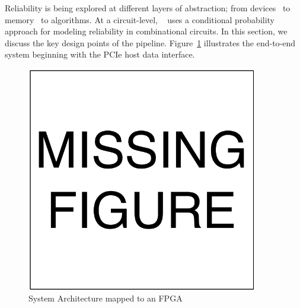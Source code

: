
Reliability is being explored at different layers of abstraction; from devices~\cite{Datta2014,Datta2015,Rahul2015} to memory~\cite{isca2014} to algorithms.
At a circuit-level, ~\cite{chen2015fast} uses a conditional probability approach for modeling reliability in combinational circuits.
In this section, we discuss the key design points of the pipeline.
Figure~\ref{fig:sys_arch} illustrates the end-to-end system beginning with the PCIe host data interface.

\begin{figure}[htb!]
\vspace{0pt}
\centering
\includegraphics[width=0.9\textwidth]{./figures/MissingFigure.pdf}
\vspace{0pt}
\caption{System Architecture mapped to an FPGA}\label{fig:sys_arch}
\vspace{0pt}
\end{figure}

